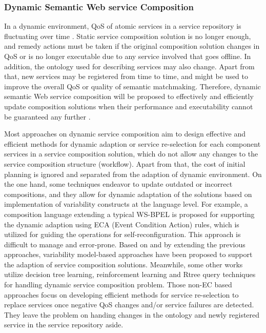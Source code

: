 \subsubsection{Dynamic Semantic Web service Composition}
In a dynamic environment, QoS of atomic services in a service repository is fluctuating over time \cite{wen2014probabilistic}. Static service composition solution is no longer enough, and remedy actions must be taken if the original composition solution changes in QoS or is no longer executable due to any service involved that goes offline. In addition, the ontology used for describing services may also change. Apart from that, new  services may be registered from time to time, and might be used to improve the overall QoS or quality of semantic matchmaking. Therefore, dynamic semantic Web service composition will be proposed to effectively and efficiently update composition solutions when their performance and executability cannot be guaranteed any further \cite{li2014fault}. 


Most approaches on dynamic service composition aim to design effective and efficient methods for dynamic adaption or service re-selection for each component services in a service composition solution, which do not allow any changes to the service composition structure (workflow). Apart from that, the cost of initial planning is ignored and separated from the adaption of dynamic environment. On the one hand, some techniques \cite{andrews2003business,baresi2011self,koning2009vxbpel} endeavor to update outdated or incorrect compositions, and they allow for dynamic adaptation of the solutions based on implementation of variability constructs at the language level. For example, a composition language extending a typical WS-BPEL \cite{andrews2003business} is proposed for supporting the dynamic adaption using ECA (Event Condition Action) rules, which is utilized for guiding the operations for self-reconfiguration. This approach is difficult to manage and error-prone. Based on and by extending the previous approaches, variability model-based approaches \cite{alferez2014dynamic} have been proposed to support the adaption of service composition solutions. Meanwhile, some other works \cite{mohanty2010web,salas2006ws,wagner2016robust,yin2010qos} utilize decision tree learning, reinforcement learning and Rtree query techniques for handling dynamic service composition problem. Those non-EC based approaches focus on developing efficient methods for service re-selection to replace services once negative QoS changes and/or service failures are detected. They leave the problem on handing changes in the ontology and newly registered service in the service repository aside.


